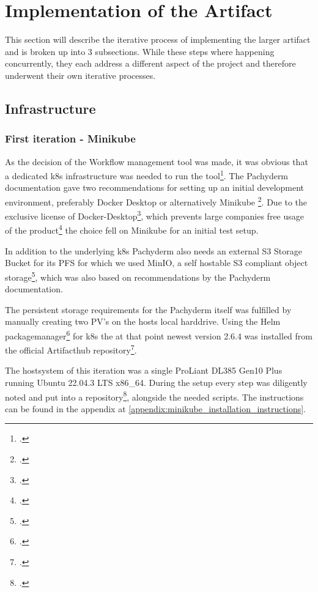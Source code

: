 \section{Implementation of the Artifact}

This section will describe the iterative process of implementing the larger artifact and is broken up into 3 subsections.
While these steps where happening concurrently, they each address a different aspect of the project and therefore underwent their own iterative processes.



\subsection{Infrastructure}


\subsubsection{First iteration - Minikube}
As the decision of the Workflow management tool was made, it was obvious that a dedicated \ac{k8s} infrastructure was needed to run the tool\footcite{PachydermDocsOnPrem}.
The Pachyderm documentation gave two recommendations for setting up an initial development environment, preferably Docker Desktop or alternatively Minikube \footcite{PachydermDocsLocal}.
Due to the exclusive license of Docker-Desktop\footcite{DockerTermsService2022},
which prevents large companies free usage of the product\footcite{DockerFAQsDocker2021} the choice fell on Minikube for an initial test setup.

In addition to the underlying \ac{k8s} Pachyderm also needs an external S3 Storage Bucket for its \ac{PFS} for which we used MinIO,
a self hostable S3 compliant object storage\footcite{incMinIOMinIOKubernetes}, which was also based on recommendations by the Pachyderm documentation.

The persistent storage requirements for the Pachyderm itself was fulfilled by manually creating two \ac{PV}'s on the hosts local harddrive.
Using the Helm packagemanager\footcite{HelmDocsHome} for \ac{k8s} the at that point newest version 2.6.4 was installed from the official Artifacthub repository\footcite{ArtifacthubPachyderm}.

The hostsystem of this iteration was a single ProLiant DL385 Gen10 Plus running Ubuntu 22.04.3 LTS x86\_64.
During the setup every step was diligently noted and put into a repository\footcite{eckerthInstallationInstructionsMinikube}, alongside the needed scripts. 
The instructions can be found in the appendix at \ref{appendix:minikube_installation_instructions}.


